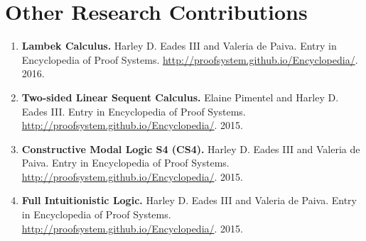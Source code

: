 \documentclass[11pt]{article}
\begin{document}

    \section{Other Research Contributions}
    \label{subsec:other_work}
    \begin{enumerate}      
    \item[] \textbf{Lambek Calculus.} Harley D. Eades III and Valeria de
      Paiva. Entry in Encyclopedia of Proof
      Systems. \url{http://proofsystem.github.io/Encyclopedia/}. 2016.

    \item[] \textbf{Two-sided Linear Sequent Calculus.} Elaine Pimentel and Harley D. Eades III. Entry in Encyclopedia of Proof Systems. \url{http://proofsystem.github.io/Encyclopedia/}. 2015.

    \item[] \textbf{Constructive Modal Logic S4 (CS4).} Harley D. Eades III and Valeria de Paiva. Entry in Encyclopedia of Proof Systems. \url{http://proofsystem.github.io/Encyclopedia/}. 2015.

    \item[] \textbf{Full Intuitionistic Logic.} Harley D. Eades III and Valeria de Paiva. Entry in Encyclopedia of Proof Systems. \url{http://proofsystem.github.io/Encyclopedia/}. 2015.
    \end{enumerate}
\end{document}
